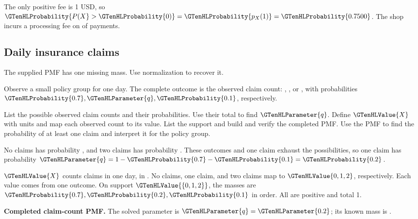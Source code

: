 The only positive fee is 1 USD, so $\GTenHLProbability{P(X}>\GTenHLProbability{0)}=\GTenHLProbability{p_{X}(1)}=\GTenHLProbability{0.7500}$. The shop incurs a processing fee on  of payments.


\subsection{Daily insurance claims}
\label{subsec:t2-c1-daily-insurance-claims}
The supplied PMF has one missing mass. Use normalization to recover it.

Observe a small policy group for one day. The complete outcome is the observed claim count: , , or , with probabilities $\GTenHLProbability{0.7},\GTenHLParameter{q},\GTenHLProbability{0.1}$, respectively.

    {List the possible observed claim counts and their probabilities. Use their total to find $\GTenHLParameter{q}$.}
    {Define $\GTenHLValue{X}$ with units and map each observed count to its value. List the support and build and verify the completed PMF.}
    {Use the PMF to find the probability of at least one claim and interpret it for the policy group.}

No claims has probability , and two claims has probability . These outcomes and one claim exhaust the possibilities, so one claim has probability $\GTenHLParameter{q}=1-\GTenHLProbability{0.7}-\GTenHLProbability{0.1}=\GTenHLProbability{0.2}$.

$\GTenHLValue{X}$ counts claims in one day, in . No claims, one claim, and two claims map to $\GTenHLValue{0,1,2}$, respectively. Each value comes from one outcome. On support $\GTenHLValue{\{0,1,2\}}$, the masses are $\GTenHLProbability{0.7},\GTenHLProbability{0.2},\GTenHLProbability{0.1}$ in order. All are positive and total 1.

\Needspace{6.8cm}
\par\noindent \begin{minipage}[t]{.485\linewidth}
\centering
{}
\par\small \textbf{Completed claim-count PMF.} The solved parameter is $\GTenHLParameter{q}=\GTenHLParameter{0.2}$; its known mass is .
\end{minipage}\par\medskip

